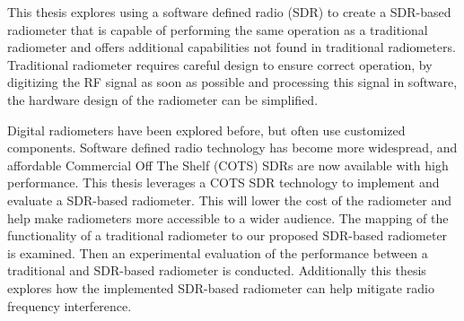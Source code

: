 
This thesis explores using a software defined radio (SDR) to create a SDR-based radiometer that is capable of performing the same operation as a traditional radiometer and offers additional capabilities not found in traditional radiometers.  Traditional radiometer requires careful design to ensure correct operation, by digitizing the RF signal as soon as possible and processing this signal in software, the hardware design of the radiometer can be simplified.

Digital radiometers have been explored before, but often use customized components.  Software defined radio technology has become more widespread, and affordable Commercial Off The Shelf (COTS) SDRs are now available with high performance.  This thesis leverages  a COTS SDR technology to implement and evaluate a SDR-based radiometer.  This will lower the cost of the radiometer and help make radiometers more accessible to a wider audience.  The mapping of the functionality of a traditional radiometer to our proposed SDR-based radiometer is examined.  Then an experimental evaluation of the performance between a traditional and SDR-based radiometer is conducted.  Additionally this thesis explores how the implemented SDR-based radiometer can help mitigate radio frequency interference.
